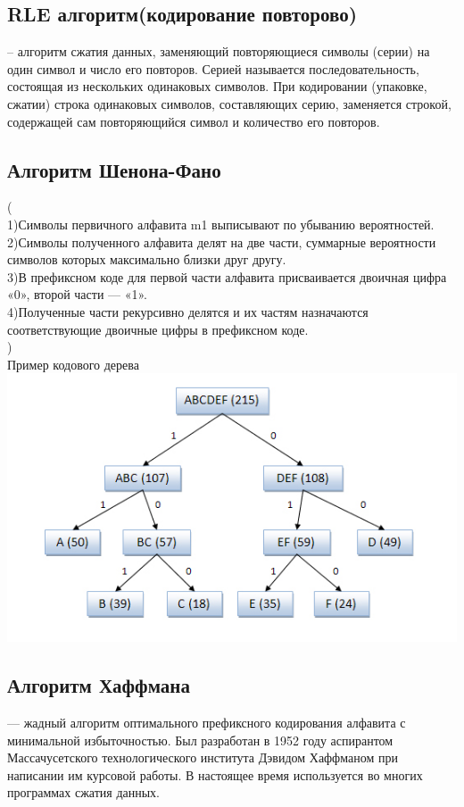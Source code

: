 \documentclass[a4paper, 12pt]{article}
\begin{document}
\subsection*{RLE алгоритм(кодирование повторово)}
--  алгоритм сжатия данных, заменяющий повторяющиеся символы (серии) на один символ и число его повторов. Серией называется последовательность, состоящая из нескольких одинаковых символов. При кодировании (упаковке, сжатии) строка одинаковых символов, составляющих серию, заменяется строкой, содержащей сам повторяющийся символ и количество его повторов. 

\subsection*{Алгоритм Шенона-Фано}
(\\
1)Символы первичного алфавита m1 выписывают по убыванию вероятностей.\\
2)Символы полученного алфавита делят на две части, суммарные вероятности символов которых максимально близки друг другу.\\
3)В префиксном коде для первой части алфавита присваивается двоичная цифра «0», второй части — «1».\\
4)Полученные части рекурсивно делятся и их частям назначаются соответствующие двоичные цифры в префиксном коде.\\
)\\

Пример кодового дерева\\
\includegraphics{img/52.PNG}\\

\subsection*{Алгоритм Хаффмана} — жадный алгоритм оптимального префиксного кодирования алфавита с минимальной избыточностью. Был разработан в 1952 году аспирантом Массачусетского технологического института Дэвидом Хаффманом при написании им курсовой работы. В настоящее время используется во многих программах сжатия данных.\\
\end{document}
